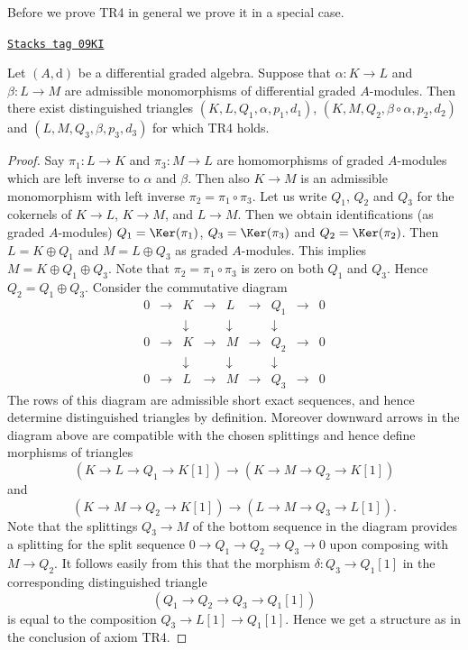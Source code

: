 Before we prove TR4 in general we prove it in a special case.

\begin{lemma}
\label{dga-lemma-two-split-injections}
\href{https://stacks.math.columbia.edu/tag/09KI}{\texttt{Stacks tag 09KI}}

Let $(A, \text{d})$ be a differential graded algebra. Suppose that
$\alpha : K \to L$ and $\beta : L \to M$ are admissible monomorphisms
of differential graded $A$-modules. Then there exist distinguished triangles
$(K, L, Q_1, \alpha, p_1, d_1)$, $(K, M, Q_2, \beta \circ \alpha, p_2, d_2)$
and $(L, M, Q_3, \beta, p_3, d_3)$ for which TR4 holds.
\end{lemma}

\begin{proof}
Say $\pi_1 : L \to K$ and $\pi_3 : M \to L$ are homomorphisms
of graded $A$-modules which are left inverse to $\alpha$ and $\beta$.
Then also $K \to M$ is an admissible monomorphism with left
inverse $\pi_2 = \pi_1 \circ \pi_3$. Let us write $Q_1$, $Q_2$
and $Q_3$ for the cokernels of $K \to L$, $K \to M$, and $L \to M$.
Then we obtain identifications (as graded $A$-modules)
$Q_1 = \Ker(\pi_1)$, $Q_3 = \Ker(\pi_3)$ and
$Q_2 = \Ker(\pi_2)$. Then $L = K \oplus Q_1$ and
$M = L \oplus Q_3$ as graded $A$-modules. This implies
$M = K \oplus Q_1 \oplus Q_3$. Note that $\pi_2 = \pi_1 \circ \pi_3$
is zero on both $Q_1$ and $Q_3$. Hence $Q_2 = Q_1 \oplus Q_3$.
Consider the commutative diagram
$$
\begin{matrix}
0 & \to & K & \to & L & \to & Q_1 & \to & 0 \\
  &     & \downarrow &     & \downarrow &     & \downarrow  & \\
0 & \to & K & \to & M & \to & Q_2 & \to & 0 \\
  &     & \downarrow &     & \downarrow &     & \downarrow  & \\
0 & \to & L & \to & M & \to & Q_3 & \to & 0
\end{matrix}
$$
The rows of this diagram are admissible short exact sequences, and
hence determine distinguished triangles by definition. Moreover
downward arrows in the diagram above are compatible with the chosen
splittings and hence define morphisms of triangles
$$
(K \to L \to Q_1 \to K[1])
\longrightarrow
(K \to M \to Q_2 \to K[1])
$$
and
$$
(K \to M \to Q_2 \to K[1])
\longrightarrow
(L \to M \to Q_3 \to L[1]).
$$
Note that the splittings $Q_3 \to M$ of the bottom sequence in the
diagram provides a splitting for the split sequence
$0 \to Q_1 \to Q_2 \to Q_3 \to 0$ upon composing with $M \to Q_2$.
It follows easily from this that the morphism $\delta : Q_3 \to Q_1[1]$
in the corresponding distinguished triangle
$$
(Q_1 \to Q_2 \to Q_3 \to Q_1[1])
$$
is equal to the composition $Q_3 \to L[1] \to Q_1[1]$.
Hence we get a structure as in the conclusion of axiom TR4.
\end{proof}

